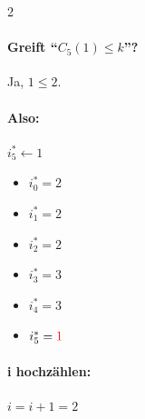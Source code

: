 \begin{multicols}{2}
    \paragraph{Greift ``$C_5(1)\le k$''?} Ja, $1 \le 2$.
    \paragraph{Also:} $i_5^\ast \gets 1$
    \columnbreak
    \begin{itemize}
        \item $i_0^\ast = 2$
        \item $i_1^\ast = 2 $
        \item $i_2^\ast = 2$
        \item $i_3^\ast = 3 $
        \item $i_4^\ast = 3$
        \item $i_5^\ast = \textcolor{red}{1}$
    \end{itemize}
\end{multicols}

\paragraph{i hochzählen:} $i = i + 1 = 2$


